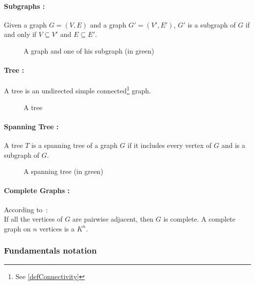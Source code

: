 \paragraph{Subgraphs :}
Given a graph $G = (V,E)$ and a graph $G' = (V',E')$, $G'$ is a subgraph of $G$ 
if and only if $V \subseteq V'$ and $E \subseteq E'$.

\begin{figure}[!h]
  \begin{center}
    
  \end{center}
  \caption{A graph and one of his subgraph (in green)}
\end{figure}

\paragraph{Tree :}
A tree is an undirected simple connected\footnote{See \ref{defConnectivity}}
graph.

\begin{figure}[!h]
  \begin{center}
    
  \end{center}
  \caption{A tree}
\end{figure}

\paragraph{Spanning Tree :}
A tree $T$ is a spanning tree of a graph $G$ if it includes every vertex of $G$ 
and is a subgraph of $G$.

\begin{figure}[!h]
  \begin{center}
    
  \end{center}
  \caption{A spanning tree (in green)}
\end{figure}

\paragraph{Complete Graphs :}
According to~\cite{Diestel}:\\
If all the vertices of $G$ are pairwise adjacent, then $G$ is complete. A
complete graph on $n$ vertices is a $K^n$.

\subsubsection{Fundamentals notation}
